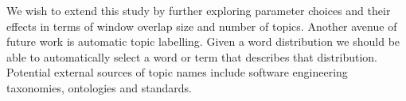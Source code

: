 \documentclass[times, 10pt,twocolumn]{article}
\newcommand{\shrinkit}{\vspace*{-.3em}}
\begin{document}
\shrinkit
{}
\shrinkit
\shrinkit

We wish to extend this study by further exploring parameter
  choices and their effects in terms of window overlap size and number
 of topics.
Another avenue of future work is automatic topic labelling. Given a word
distribution we should be able to automatically select a word or term
that describes that distribution. Potential external sources of topic
names include software engineering taxonomies, ontologies and
standards.
\newline{}
\shrinkit


\shrinkit


%


\end{document}
